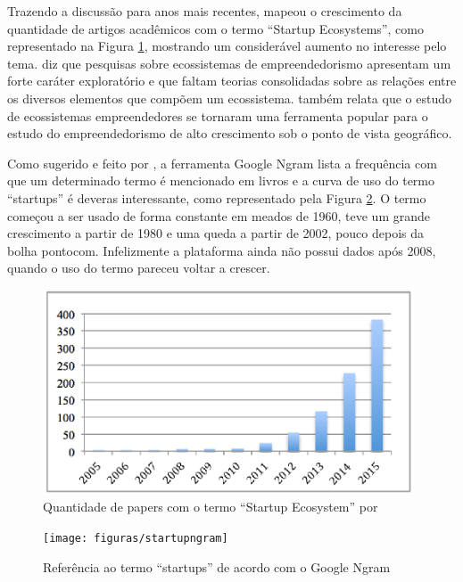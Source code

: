 Trazendo a discussão para anos mais recentes,  mapeou o crescimento da quantidade de artigos acadêmicos com o termo ``Startup Ecosystems'', como representado na Figura \ref{figure:papers_about_startup_ecosystems}, mostrando um considerável aumento no interesse pelo tema.  diz que pesquisas sobre ecossistemas de empreendedorismo apresentam um forte caráter exploratório e que faltam teorias consolidadas sobre as relações entre os diversos elementos que compõem um ecossistema.  também relata que o estudo de ecossistemas empreendedores se tornaram uma ferramenta popular para o estudo do empreendedorismo de alto crescimento sob o ponto de vista geográfico. 

Como sugerido e feito por , a ferramenta Google Ngram lista a frequência com que um determinado termo é mencionado em livros e a curva de uso do termo ``startups'' é deveras interessante, como representado pela Figura \ref{figure:startupngram}. O termo começou a ser usado de forma constante em meados de 1960, teve um grande crescimento a partir de 1980 e uma queda a partir de 2002, pouco depois da bolha pontocom. Infelizmente a plataforma ainda não possui dados após 2008, quando o uso do termo pareceu voltar a crescer. 

\begin{figure}[!htb]
	\centering
	\includegraphics[width=11cm,angle=0]{figuras/papers_about_startup_ecosystems}
	\caption{Quantidade de papers com o termo ``Startup Ecosystem'' por }
	\label{figure:papers_about_startup_ecosystems}
\end{figure}

\begin{figure}[!htb]
	\centering
	\texttt{[image: figuras/startupngram]}
	\caption{Referência ao termo ``startups'' de acordo com o Google Ngram}
	\label{figure:startupngram}
\end{figure}

